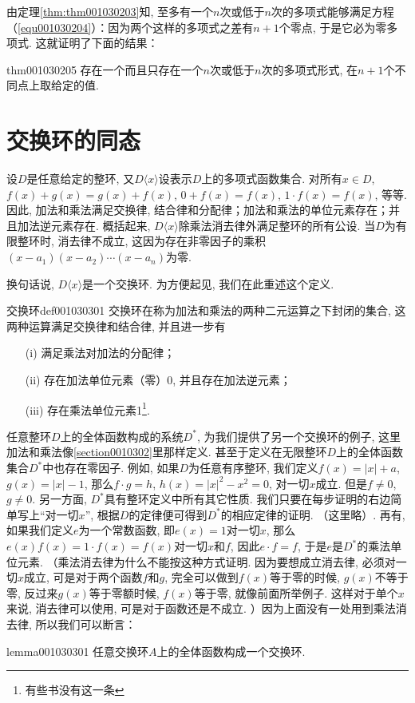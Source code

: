 由定理\ref{thm:thm001030203}知, 至多有一个$n$次或低于$n$次的多项式能够满足方程（\ref{equ001030204}）：因为两个这样的多项式之差有$n+1$个零点, 于是它必为零多项式. 这就证明了下面的结果：
\begin{theorem}{}{thm001030205}
存在一个而且只存在一个$n$次或低于$n$次的多项式形式, 在$n+1$个不同点上取给定的值. 
\end{theorem}



\section{交换环的同态}\label{section0010303}
设$D$是任意给定的整环, 又$D\langle{}x\rangle$设表示$D$上的多项式函数集合. 对所有$x \in D$, $f(x)+g(x)=g(x)+f(x)$, $0+f(x)=f(x)$, $1 \cdot f(x)=f(x)$, 等等. 因此, 加法和乘法满足交换律, 结合律和分配律；加法和乘法的单位元素存在；并且加法逆元素存在. 概括起来, $D\langle{}x\rangle$除乘法消去律外满足整环的所有公设. 当$D$为有限整环时, 消去律不成立, 这因为存在非零因子的乘积$(x-a_1)(x-a_2)\cdots(x-a_n)$为零. 

换句话说, $D\langle{}x\rangle$是一个交换环. 为方便起见, 我们在此重述这个定义. 
\begin{definition}{交换环}{def001030301}
交换环在称为加法和乘法的两种二元运算之下封闭的集合, 这两种运算满足交换律和结合律, 并且进一步有
\begin{enumerate}
\item[(i)] 满足乘法对加法的分配律；
\item[(ii)] 存在加法单位元素（零）0, 并且存在加法逆元素；
\item[(iii)] 存在乘法单位元素1\footnote{有些书没有这一条}. 
\end{enumerate}
\end{definition}

任意整环$D$上的全体函数构成的系统$D^*$, 为我们提供了另一个交换环的例子, 这里加法和乘法像\ref{section0010302}里那样定义. 甚至于定义在无限整环$D$上的全体函数集合$D^*$中也存在零因子. 例如, 如果$D$为任意有序整环, 我们定义$f(x)=|x|+a$, $g(x)=|x|-1$, 那么$f\cdot{}g=h$, $h(x)=|x|^2-x^2=0$, 对一切$x$成立. 但是$f \neq 0$, $g \neq 0$. 另一方面, $D^*$具有整环定义中所有其它性质. 我们只要在每步证明的右边简单写上“对一切$x$”, 根据$D$的定律便可得到$D^*$的相应定律的证明. （这里略）. 再有, 如果我们定义$e$为一个常数函数, 即$e(x)=1$对一切$x$, 那么$e(x)f(x)=1\cdot{}f(x)=f(x)$对一切$x$和$f$, 因此$e \cdot f = f$, 于是$e$是$D^*$的乘法单位元素. （乘法消去律为什么不能按这种方式证明. 因为要想成立消去律, 必须对一切$x$成立, 可是对于两个函数$f$和$g$, 完全可以做到$f(x)$等于零的时候, $g(x)$不等于零, 反过来$g(x)$等于零额时候, $f(x)$等于零, 就像前面所举例子. 这样对于单个$x$来说, 消去律可以使用, 可是对于函数还是不成立. ）因为上面没有一处用到乘法消去律, 所以我们可以断言：
\begin{lemma}{}{lemma001030301}
任意交换环$A$上的全体函数构成一个交换环. 
\end{lemma}

